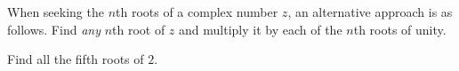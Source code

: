 \documentclass[11pt,fleqn,dvipsnames,usenames]{article}
\begin{document}
%
\begin{remark}
When seeking the $n$th roots of a complex number $z$, an alternative approach is as follows.  Find \emph{any} $n$th root of $z$ and multiply it by each of the $n$th roots of unity.
\end{remark}
%
\begin{example*}
Find all the fifth roots of $2$.
\end{example*}
%
\begin{solution}
\end{solution}
\end{document}
